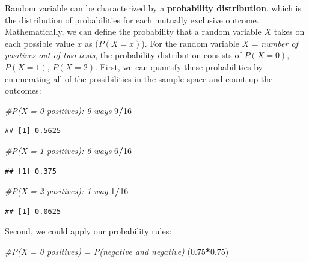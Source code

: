 \documentclass[
]{book}
\newenvironment{Shaded}{\begin{snugshade}}{\end{snugshade}}
\newcommand{\CommentTok}[1]{\textcolor[rgb]{0.56,0.35,0.01}{\textit{#1}}}
\newcommand{\DecValTok}[1]{\textcolor[rgb]{0.00,0.00,0.81}{#1}}
\newcommand{\FloatTok}[1]{\textcolor[rgb]{0.00,0.00,0.81}{#1}}
\newcommand{\NormalTok}[1]{#1}
\newcommand{\SpecialCharTok}[1]{\textcolor[rgb]{0.81,0.36,0.00}{\textbf{#1}}}
\begin{document}
Random variable can be characterized by a \textbf{probability distribution}, which is the distribution of probabilities for each mutually exclusive outcome. Mathematically, we can define the probability that a random variable \(X\) takes on each possible value \(x\) as (\(P(X = x)\)). For the random variable \(X\) = \emph{number of positives out of two tests}, the probability distribution consists of \(P(X = 0)\), \(P(X = 1)\), \(P(X = 2)\). First, we can quantify these probabilities by enumerating all of the possibilities in the sample space and count up the outcomes:

\begin{Shaded}
\begin{Highlighting}[]
\CommentTok{\#P(X = 0 positives): 9 ways}
\DecValTok{9}\SpecialCharTok{/}\DecValTok{16}
\end{Highlighting}
\end{Shaded}

\begin{verbatim}
## [1] 0.5625
\end{verbatim}

\begin{Shaded}
\begin{Highlighting}[]
\CommentTok{\#P(X = 1 positives): 6 ways}
\DecValTok{6}\SpecialCharTok{/}\DecValTok{16}
\end{Highlighting}
\end{Shaded}

\begin{verbatim}
## [1] 0.375
\end{verbatim}

\begin{Shaded}
\begin{Highlighting}[]
\CommentTok{\#P(X = 2 positives): 1 way}
\DecValTok{1}\SpecialCharTok{/}\DecValTok{16}
\end{Highlighting}
\end{Shaded}

\begin{verbatim}
## [1] 0.0625
\end{verbatim}

Second, we could apply our probability rules:

\begin{Shaded}
\begin{Highlighting}[]
\CommentTok{\#P(X = 0 positives) = P(negative and negative)}
\NormalTok{(}\FloatTok{0.75}\SpecialCharTok{*}\FloatTok{0.75}\NormalTok{)}
\end{Highlighting}
\end{Shaded}
\end{document}
